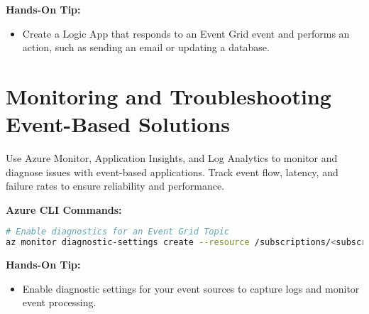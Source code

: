 \documentclass{article}
\begin{document}
\textbf{Hands-On Tip:}
\begin{itemize}
    \item Create a Logic App that responds to an Event Grid event and performs an action, such as sending an email or updating a database.
\end{itemize}

\section{Monitoring and Troubleshooting Event-Based Solutions}
Use Azure Monitor, Application Insights, and Log Analytics to monitor and diagnose issues with event-based applications. Track event flow, latency, and failure rates to ensure reliability and performance.

\textbf{Azure CLI Commands:}
\begin{lstlisting}[language=bash]
# Enable diagnostics for an Event Grid Topic
az monitor diagnostic-settings create --resource /subscriptions/<subscription-id>/resourceGroups/MyResourceGroup/providers/Microsoft.EventGrid/topics/MyEventGridTopic --name MyDiagnostics --logs '[{"category": "allLogs","enabled": true}]'
\end{lstlisting}

\textbf{Hands-On Tip:}
\begin{itemize}
    \item Enable diagnostic settings for your event sources to capture logs and monitor event processing.
\end{itemize}
\end{document}
